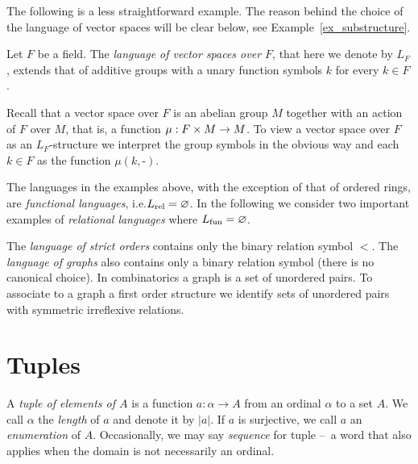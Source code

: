 The following is a less straightforward example. The reason behind the choice of the language of vector spaces will be clear below, see Example~\ref{ex_substructure}.

\begin{example}\label{linguaggio_spazi_vettoriali}
Let $F$ be a field. The \emph{language of vector spaces over $F$\/}, that here we denote by $L_F$, extends that of additive groups with a unary function symbols $k$ for every $k\in F$. 

Recall that a vector space over $F$ is an abelian group $M$ together with an action of $F$ over $M$, that is, a function $\mu:F\times M\rightarrow M$. To view a vector space over $F$ as an $L_F$-structure we interpret the group symbols in the obvious way and each $k\in F$ as the function $\mu(k,\mbox{-})$.\QED
\end{example}

The languages in the examples above, with the exception of that of ordered rings, are \emph{functional languages}, i.e.\@ $L_{\rm rel}=\varnothing$. In the following we consider two important examples of \emph{relational languages\/} where $L_{\rm fun}=\varnothing$.

\begin{example}\label{expl_graph1}
The \emph{language of strict orders\/} contains only the binary relation symbol $<$. The \emph{language of graphs\/} also contains only a binary relation symbol (there is no canonical choice). In combinatorics a graph is a set of unordered pairs. To associate to a graph a first order structure we identify sets of unordered pairs with symmetric irreflexive relations.\QED
\end{example}


\section{Tuples}
A \emph{tuple of elements of $A$\/} is a function $a:\alpha\to A$ from an ordinal $\alpha$ to a set $A$.  We call $\alpha$ the \emph{length} of $a$ and denote it by \emph{$|a|$}. If $a$ is surjective, we call $a$ an \emph{enumeration\/} of $A$. Occasionally, we may say \emph{sequence\/} for tuple --~a word that also applies when the domain is not necessarily an ordinal.

